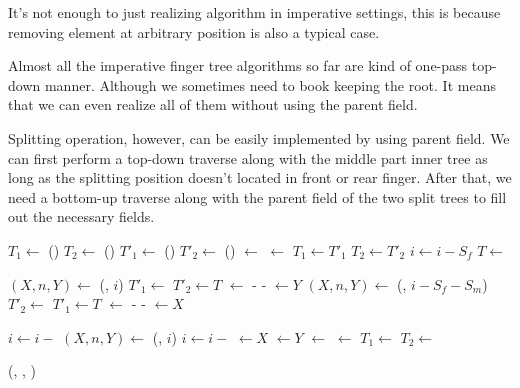\documentclass[UTF8]{article}
\begin{document}
It's not enough to just realizing  algorithm in imperative settings, this
is because removing element at arbitrary position is also a typical case.

Almost all the imperative finger tree algorithms so far are kind of one-pass top-down manner.
Although we sometimes need to book keeping the root. It means that we can even realize all
of them without using the parent field.

Splitting operation, however, can be easily implemented by using parent field. We can first
perform a top-down traverse along with the middle part inner tree as long as the splitting position
doesn't located in front or rear finger. After that, we need a bottom-up traverse along
with the parent field of the two split trees to fill out the necessary fields.

\begin{algorithmic}
  \State $T_1 \gets$ ()
  \State $T_2 \gets$ ()
   
    \State $T'_1 \gets$ ()
    \State $T'_2 \gets$ ()
    \State {} $\gets$ 
    \State {} $\gets$ 
    \State {}
    \State {}
    \State $T_1 \gets T'_1$
    \State $T_2 \gets T'_2$
    \State $i \gets i - S_f$
    \State $T \gets$ 
  \EndWhile

    \State $(X, n, Y) \gets$ (, $i$)
    \State $T'_1 \gets$ 
    \State $T'_2 \gets T$
    \State {} $\gets$  -  - 
    \State {} $\gets Y$
    \State $(X, n, Y) \gets$ (, $i - S_f - S_m$)
    \State $T'_2 \gets$ 
    \State $T'_1 \gets T$
    \State {} $\gets$  -  - 
    \State {} $\gets X$
  \EndIf
  \State {}
  \State {}

  \State $i \gets i -$ 
   
    \State $(X, n, Y) \gets$ (, $i$)
    \State $i \gets i -$ 
    \State {} $\gets X$
    \State {} $\gets Y$
    \State {} $\gets$ 
    \State {} $\gets$ 
    \State $T_1 \gets$ 
    \State $T_2 \gets$ 
  \EndWhile

  \State \Return (, , )
\EndFunction
\end{algorithmic}
\end{document}
